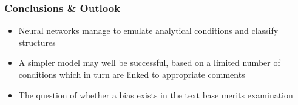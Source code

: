 \documentclass{beamer}
\begin{document}
\begin{frame}
\frametitle{Conclusions \& Outlook}
\begin{itemize}
\item Neural networks manage to emulate analytical conditions and classify structures
\item A simpler model may well be successful, based on a limited number of conditions which in turn are linked to appropriate comments
\item The question of whether a bias exists in the text base merits  examination
\end{itemize}
\end{frame}
\end{document}
